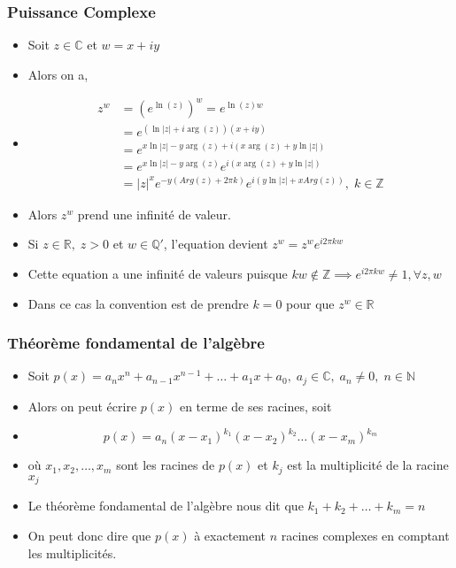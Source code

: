 \subsubsection*{Puissance Complexe}
\begin{itemize} 
    \item[] Soit $z \in \mathbb{C}$ et $w= x + iy$
    \item[] Alors on a,
    \item[] \begin{align*}
        z^w &= \left( e^{\ln(z)}\right)^{w} = e^{\ln(z)w} \\ 
        &= e^{\left(\ln|z| + i\arg(z)\right)\left(x + iy\right)} \\
        &= e^{ x\ln|z| - y\arg(z) + i\left( x\arg(z) + y\ln|z|\right) } \\
        &= e^{x\ln|z| - y\arg(z)}e^{i\left( x\arg(z) + y\ln|z| \right)} \\
        &= |z|^{x} e^{-y\left( Arg(z) + 2\pi k \right)} e^{ i \left( y\ln|z| + xArg(z) \right) }, \; k \in \mathbb{Z}
    \end{align*}
    \item[] Alors $z^w$ prend une infinité de valeur.
    \item[] Si $z \in \mathbb{R},\; z > 0$ et $w \in \mathbb{Q}'$, l'equation devient $z^w = z^w e^{i 2 \pi k w}$ 
    \item[] Cette equation a une infinité de valeurs puisque $kw \not\in \mathbb{Z} \implies e^{i 2 \pi k w} \neq 1, \forall z, w$
    \item[] Dans ce cas la convention est de prendre $k = 0$ pour que $z^w \in \mathbb{R}$
\end{itemize}   


\subsubsection*{Théorème fondamental de l'algèbre}
\begin{itemize}
    \item[] Soit $p(x) = a_n x^n + a_{n-1} x^{n-1} + \dots + a_1 x + a_0, \; a_j \in \mathbb{C}, \; a_n \neq 0, \; n \in \mathbb{N}$
    \item[] Alors on peut écrire $p(x)$ en terme de ses racines, soit
    \item[] \begin{equation*}
        p(x) = a_n(x - x_1)^{k_1} (x - x_2)^{k_2} \dots (x - x_m)^{k_m}
    \end{equation*}
    \item[] où $x_1, x_2, \dots ,x_m$ sont les racines de $p(x)$ et $k_j$ est la multiplicité de la racine $x_j$
    \item[] Le théorème fondamental de l'algèbre nous dit que $k_1 + k_2 + \dots + k_m = n$
    \item[] On peut donc dire que $p(x)$ à exactement $n$ racines complexes en comptant les multiplicités.
\end{itemize}